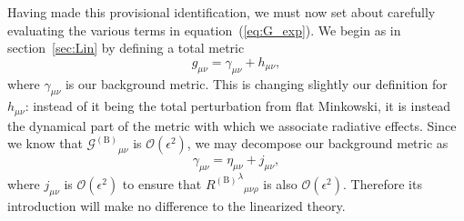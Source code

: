 \documentclass[a4paper, 11pt, titlepage, twoside]{report}
\newcommand{\eqnref}[1]{equation~(\ref{eq:#1})}
\newcommand{\secref}[1]{section~\ref{sec:#1}}
\newcommand{\order}[1]{\ensuremath{\mathcal{O}({#1})}}
\begin{document}
{Having made this provisional identification, we must now set about carefully evaluating the various terms in \eqnref{G_exp}. We begin as in \secref{Lin} by defining a total metric
\begin{equation}
g_{\mu\nu} = \gamma_{\mu\nu} + h_{\mu\nu},
\end{equation}
where $\gamma_{\mu\nu}$ is our background metric. This is changing slightly our definition for $h_{\mu\nu}$: instead of it being the total perturbation from flat Minkowski, it is instead the dynamical part of the metric with which we associate radiative effects. Since we know that ${\mathcal{G}^{(\mathrm{B})}}_{\mu\nu}$ is $\order{\epsilon^2}$, we may decompose our background metric as
\begin{equation}
\gamma_{\mu\nu} = \eta_{\mu\nu} + j_{\mu\nu},
\end{equation}
where $j_{\mu\nu}$ is $\order{\epsilon^2}$ to ensure that ${{R^{(\mathrm{B})}}^\lambda}_{\mu\nu\rho}$ is also $\order{\epsilon^2}$. Therefore its introduction will make no difference to the linearized theory.

}
\end{document}
